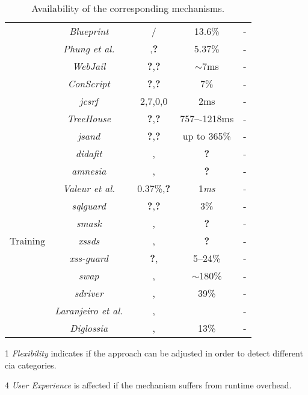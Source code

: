 \documentclass[conference]{IEEEtran}
\newcommand{\tick}{\ding{52}}
\newcommand{\xmark}{\ding{56}}
\begin{document}
\begin{table*}
\begin{threeparttable}
\begin{small}
{\begin{tabular}{l|c|ccc}
	&   {\it Blueprint}~\cite{LV09} & \tick/\tick & 13.6\% & - \\ 
	&   {\it Phung et al.}~\cite{PSC09} & \xmark,{\bf ?} & 5.37\% & - \\
	&   {\it WebJail}~\cite{VDDPJ11}  & {\bf ?},{\bf ?} & $\sim$7ms & - \\ 
	&   {\it ConScript}~\cite{ML10}  & {\bf ?},{\bf ?} & 7\% & - \\
	&   {\it j{\sc csrf}}~\cite{PS11}  & 2,7,0,0 & 2ms & - \\
    &   {\it TreeHouse}~\cite{IW12}  & {\bf ?},{\bf ?} & 757–-1218ms & - \\
   	&   {\it {\sc js}and}~\cite{AVBPDP12}  & {\bf ?},{\bf ?} & up to 365\% & - \\
	\hline
	\hline  
        \multirow{12}{*}{Training}
    &   {\it {\sc didafit}}~\cite{LLW02}  & \xmark,\xmark & {\bf ?} & - \\
	&   {\it {\sc amnesia}}~\cite{HO05,HO06,HO05b} & \tick,\tick & {\bf ?} & - \\ 
	&   {\it Valeur et al.}~\cite{VMV05} & 0.37\%,{\bf ?} & 1{\it ms} & - \\
	& 	{\it {\sc sqlg}uard}~\cite{BWS05} & {\bf ?},{\bf ?} & 3\% & - \\
	& 	{\it {\sc sm}ask}~\cite{JB07}  & \xmark,\xmark & {\bf ?} & - \\
	& 	{\it {\sc xssds}}~\cite{JEP08} & \xmark,\xmark & {\bf ?} & - \\
    & 	{\it {\sc xss-guard}}~\cite{BV08} & {\bf ?},\xmark & 5--24\% & - \\
    & 	{\it {\sc swap}}~\cite{WPLKK09} & \tick,\tick & $\sim$180\% & - \\ 
	& 	{\it {\sc sd}river}~\cite{MS09,MKS09,MKLS11} & \tick,\tick & 39\% & - \\
	& 	{\it Laranjeiro et al.}~\cite{LVM09,ALVM09,LVM10} & \xmark,\xmark  & \xmark & - \\
	& 	{\it Diglossia}~\cite{SMS13} & \xmark,\xmark  & 13\% & - \\
	\hline
    \end{tabular}}
    \begin{tablenotes}
	\begin{footnotesize}
       \item[1] {\it Flexibility} indicates if the approach can be adjusted
	in order to detect different {\sc cia} categories.
       \item[4] {\it User Experience} is affected if the mechanism suffers
	from runtime overhead.
	\end{footnotesize}
    \end{tablenotes}
    \caption{Availability of the corresponding mechanisms.}
    \label{tab:comp2}
    \end{small}
    \end{threeparttable}
\end{table*}



\end{document}
